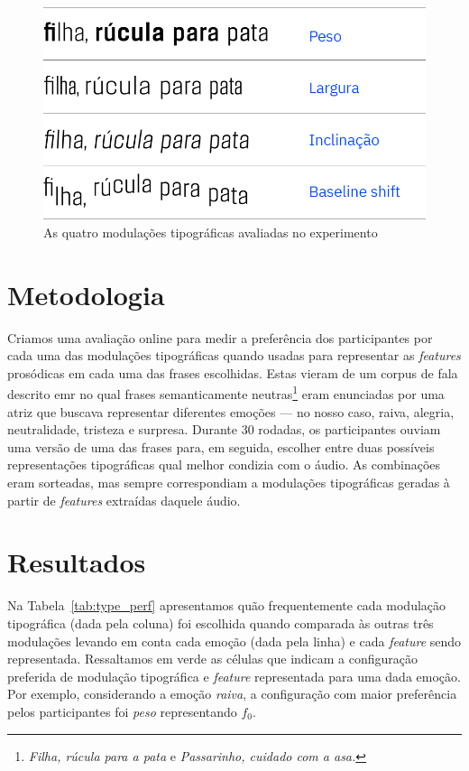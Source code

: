 \documentclass[11pt]{article}
\begin{document}
\begin{figure}[H]
     {\centering
    \includegraphics[width=\linewidth]{fig/modulacoes.png}
     \caption{As quatro modulações tipográficas avaliadas no experimento}
     \label{fig:type_modulations}\par}
\end{figure}
  
  \section{Metodologia}
  \label{sec:metodologia}
 
 Criamos uma avaliação online para medir a preferência dos participantes por cada uma das modulações tipográficas quando usadas para representar as {\itshape features} prosódicas em cada uma das frases escolhidas. Estas vieram de um corpus de fala descrito emr \cite{pdpcosta2015} no qual frases semanticamente neutras\footnote{{\itshape Filha, rúcula para a pata} e {\itshape Passarinho, cuidado com a asa.}} eram enunciadas por uma atriz que buscava representar diferentes emoções --- no nosso caso, raiva, alegria, neutralidade, tristeza e surpresa. Durante 30 rodadas, os participantes ouviam uma versão de uma das frases para, em seguida, escolher entre duas possíveis representações tipográficas qual melhor condizia com o áudio. As combinações eram sorteadas, mas sempre correspondiam a modulações tipográficas geradas à partir de {\itshape features} extraídas daquele áudio.
  


\section{Resultados}
  \label{sec:resultados}
  
  Na Tabela~\ref{tab:type_perf} apresentamos quão frequentemente cada modulação tipográfica (dada pela coluna) foi escolhida quando comparada às outras três modulações levando em conta cada emoção (dada pela linha) e cada {\itshape feature} sendo representada. Ressaltamos em verde as células que indicam a configuração preferida de modulação tipográfica e {\itshape feature} representada para uma dada emoção. Por exemplo, considerando a emoção {\itshape raiva}, a configuração com maior preferência pelos participantes foi {\itshape peso} representando $f_0$.
  
\end{document}
